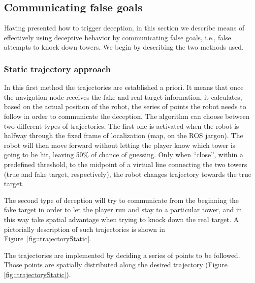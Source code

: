 \subsection{Communicating false goals}
Having presented how to trigger deception, in this section we describe means of effectively using deceptive behavior by communicating false goals, i.e., false attempts to knock down towers. We begin by describing the two methods used.
\subsubsection{Static trajectory approach}
In this first method the trajectories are established a priori. It means that once the navigation node receives the fake and real target information, it calculates, based on the actual position of the robot, the series of points the robot needs to follow in order to communicate the deception.
The algorithm can choose between two different types of trajectories. The first one is activated when the robot is halfway through the fixed frame of localization (map, on the ROS jargon). The robot will then move forward without letting the player know which tower is going to be hit, leaving 50\% of chance of guessing. Only when ``close'', within a predefined threshold, to the midpoint of a virtual line connecting the two towers (true and fake target, respectively), the robot changes trajectory towards the true target.

The second type of deception will try to communicate from the beginning the fake target in order to let the player run and stay to a particular tower, and in this way take spatial advantage when trying to knock down the real target. A pictorially description of such trajectories is shown in Figure~\ref{fig::trajectoryStatic}.

The trajectories are implemented by deciding a series of points to be followed. Those points are spatially distributed along the desired trajectory (Figure \ref{fig::trajectoryStatic}).

